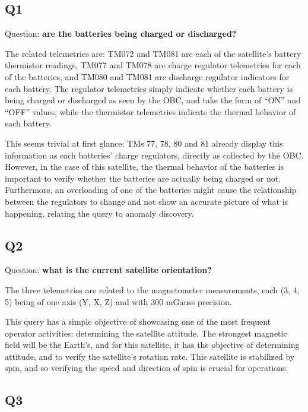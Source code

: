 \subsection{Q1}\label{q1}

Question: \textbf{are the batteries being charged or discharged?}

The related telemetries are: TM072 and TM081 are each of the satellite's battery thermistor readings, TM077 and TM078 are charge regulator telemetries for each of the batteries, and TM080 and TM081 are discharge regulator indicators for each battery.
The regulator telemetries simply indicate whether each battery is being charged or discharged as seen by the OBC, and take the form of ``ON'' and ``OFF'' values, while the thermistor telemetries indicate the thermal behavior of each battery.

This seems trivial at first glance: TMs 77, 78, 80 and 81 already display this information as each batteries' charge regulators, directly as collected by the OBC.
However, in the case of this satellite, the thermal behavior of the batteries is important to verify whether the batteries are actually being charged or not.
Furthermore, an overloading of one of the batteries might cause the relationship between the regulators to change and not show an accurate picture of what is happening, relating the query to anomaly discovery.

\subsection{Q2}\label{q2}

Question: \textbf{what is the current satellite orientation?}

The three telemetries are related to the magnetometer measurements, each (3, 4, 5) being of one axis (Y, X, Z) and with 300 mGauss precision.

This query has a simple objective of showcasing one of the most frequent operator activities: determining the satellite attitude.
The strongest magnetic field will be the Earth's, and for this satellite, it has the objective of determining attitude, and to verify the satellite's rotation rate.
This satellite is stabilized by spin, and so verifying the speed and direction of spin is crucial for operations.

\subsection{Q3}\label{q3}

